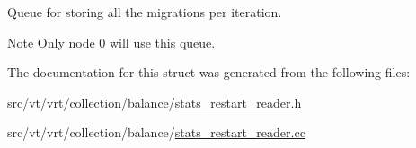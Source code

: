 Queue for storing all the migrations per iteration. 

\begin{DoxyNote}{Note}
Only node 0 will use this queue. 
\end{DoxyNote}


The documentation for this struct was generated from the following files\+:\begin{DoxyCompactItemize}
\item 
src/vt/vrt/collection/balance/\hyperlink{stats__restart__reader_8h}{stats\+\_\+restart\+\_\+reader.\+h}\item 
src/vt/vrt/collection/balance/\hyperlink{stats__restart__reader_8cc}{stats\+\_\+restart\+\_\+reader.\+cc}\end{DoxyCompactItemize}
